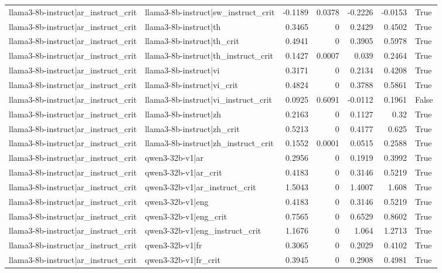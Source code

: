 \begin{table}
\begin{tabular}{l l r r r r l}
llama3-8b-instruct|ar_instruct_crit & llama3-8b-instruct|sw_instruct_crit & -0.1189 & 0.0378 & -0.2226 & -0.0153 & True \\
llama3-8b-instruct|ar_instruct_crit & llama3-8b-instruct|th & 0.3465 & 0 & 0.2429 & 0.4502 & True \\
llama3-8b-instruct|ar_instruct_crit & llama3-8b-instruct|th_crit & 0.4941 & 0 & 0.3905 & 0.5978 & True \\
llama3-8b-instruct|ar_instruct_crit & llama3-8b-instruct|th_instruct_crit & 0.1427 & 0.0007 & 0.039 & 0.2464 & True \\
llama3-8b-instruct|ar_instruct_crit & llama3-8b-instruct|vi & 0.3171 & 0 & 0.2134 & 0.4208 & True \\
llama3-8b-instruct|ar_instruct_crit & llama3-8b-instruct|vi_crit & 0.4824 & 0 & 0.3788 & 0.5861 & True \\
llama3-8b-instruct|ar_instruct_crit & llama3-8b-instruct|vi_instruct_crit & 0.0925 & 0.6091 & -0.0112 & 0.1961 & False \\
llama3-8b-instruct|ar_instruct_crit & llama3-8b-instruct|zh & 0.2163 & 0 & 0.1127 & 0.32 & True \\
llama3-8b-instruct|ar_instruct_crit & llama3-8b-instruct|zh_crit & 0.5213 & 0 & 0.4177 & 0.625 & True \\
llama3-8b-instruct|ar_instruct_crit & llama3-8b-instruct|zh_instruct_crit & 0.1552 & 0.0001 & 0.0515 & 0.2588 & True \\
llama3-8b-instruct|ar_instruct_crit & qwen3-32b-v1|ar & 0.2956 & 0 & 0.1919 & 0.3992 & True \\
llama3-8b-instruct|ar_instruct_crit & qwen3-32b-v1|ar_crit & 0.4183 & 0 & 0.3146 & 0.5219 & True \\
llama3-8b-instruct|ar_instruct_crit & qwen3-32b-v1|ar_instruct_crit & 1.5043 & 0 & 1.4007 & 1.608 & True \\
llama3-8b-instruct|ar_instruct_crit & qwen3-32b-v1|eng & 0.4183 & 0 & 0.3146 & 0.5219 & True \\
llama3-8b-instruct|ar_instruct_crit & qwen3-32b-v1|eng_crit & 0.7565 & 0 & 0.6529 & 0.8602 & True \\
llama3-8b-instruct|ar_instruct_crit & qwen3-32b-v1|eng_instruct_crit & 1.1676 & 0 & 1.064 & 1.2713 & True \\
llama3-8b-instruct|ar_instruct_crit & qwen3-32b-v1|fr & 0.3065 & 0 & 0.2029 & 0.4102 & True \\
llama3-8b-instruct|ar_instruct_crit & qwen3-32b-v1|fr_crit & 0.3945 & 0 & 0.2908 & 0.4981 & True \\

\end{tabular}
\end{table}
